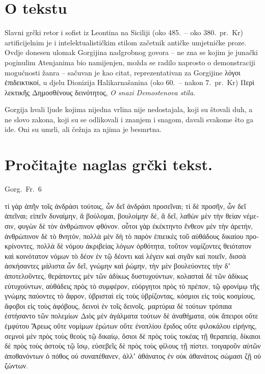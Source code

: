 
\section*{O tekstu}

Slavni grčki retor i sofist iz Leontina na Siciliji (oko 485.\ – oko 380.\ pr.~Kr) artificijelnim je i intelektualističkim stilom začetnik antičke umjetničke proze. Ovdje donesen ulomak Gorgijina nadgrobnog govora – ne zna se kojim je junački poginulim Atenjanima bio namijenjen, možda se radilo naprosto o demonstraciji mogućnosti žanra – sačuvan je kao citat, reprezentativan za Gorgijine \textgreek{λόγοι ἐπιδεικτικοί,} u djelu Dionizija Halikarnašanina (oko 60.\ – nakon 7.\ pr.~Kr) \textgreek{Περὶ λεκτικῆς Δημοσθένους δεινότητος,} \textit{O snazi Demostenova stila}.

Gorgija hvali ljude kojima nijedna vrlina nije nedostajala, koji su štovali duh, a ne slovo zakona, koji su se odlikovali i znanjem i snagom, davali svakome što ga ide. Oni su umrli, ali čežnja za njima je besmrtna.



\section*{Pročitajte naglas grčki tekst.}

Gorg.\ Fr.\ 6


\medskip


{\large

\begin{greek}

\noindent τί γὰρ ἀπῆν τοῖς ἀνδράσι τούτοις, ὧν δεῖ ἀνδράσι προσεῖναι; τί δὲ προσῆν, ὧν δεῖ ἀπεῖναι; εἰπεῖν δυναίμην, ἃ βούλομαι, βουλοίμην δέ, ἃ δεῖ, λαθὼν μὲν τὴν θείαν νέμεσιν, φυγὼν δὲ τὸν ἀνθρώπινον φθόνον. οὗτοι γὰρ ἐκέκτηντο ἔνθεον μὲν τὴν ἀρετήν, ἀνθρώπινον δὲ τὸ θνητόν, πολλὰ μὲν δὴ τὸ παρὸν ἐπιεικὲς τοῦ αὐθάδους δικαίου προκρίνοντες, πολλὰ δὲ νόμου ἀκριβείας λόγων ὀρθότητα, τοῦτον νομίζοντες θειότατον καὶ κοινότατον νόμων τὸ δέον ἐν τῷ δέοντι καὶ λέγειν καὶ σιγᾶν καὶ ποιεῖν, δισσὰ ἀσκήσαντες μάλιστα ὧν δεῖ, γνώμην καὶ ῥώμην, τὴν μὲν βουλεύοντες τὴν δʼ ἀποτελοῦντες, θεράποντες μὲν τῶν ἀδίκως δυστυχούντων, κολασταὶ δὲ τῶν ἀδίκως εὐτυχούντων, αὐθάδεις πρὸς τὸ συμφέρον, εὐόργητοι πρὸς τὸ πρέπον, τῷ φρονίμῳ τῆς γνώμης παύοντες τὸ ἄφρον, ὑβρισταὶ εἰς τοὺς ὑβρίζοντας, κόσμιοι εἰς τοὺς κοσμίους, ἄφοβοι εἰς τοὺς ἀφόβους, δεινοὶ ἐν τοῖς δεινοῖς. μαρτύρια δὲ τούτων τρόπαια ἐστήσαντο τῶν πολεμίων Διὸς μὲν ἀγάλματα τούτων δὲ ἀναθήματα, οὐκ ἄπειροι οὔτε ἐμφύτου Ἄρεως οὔτε νομίμων ἐρώτων οὔτε ἐνοπλίου ἔριδος οὔτε φιλοκάλου εἰρήνης, σεμνοὶ μὲν πρὸς τοὺς θεοὺς τῷ δικαίῳ, ὅσιοι δὲ πρὸς τοὺς τοκέας τῇ θεραπείᾳ, δίκαιοι δὲ πρὸς τοὺς ἀστοὺς τῷ ἴσῳ, εὐσεβεῖς δὲ πρὸς τοὺς φίλους τῇ πίστει. τοιγαροῦν αὐτῶν ἀποθανόντων ὁ πόθος οὐ συναπέθανεν, ἀλλʼ ἀθάνατος ἐν οὐκ ἀθανάτοις σώμασι ζῇ οὐ ζώντων.

\end{greek}

}


